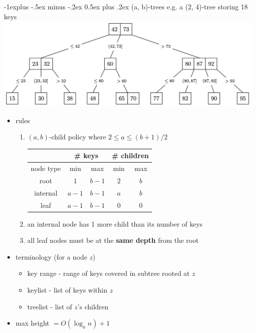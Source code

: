 \documentclass[10pt, landscape]{article}
\makeatletter
\renewcommand{\subsection}{\@startsection{subsection}{2}{0mm}%
                                {-1explus -.5ex minus -.2ex}%
                                {0.5ex plus .2ex}%
                                {\normalfont\normalsize\bfseries}}
\makeatother
\begin{document}
\begin{multicols}{3}
\subsection{(a, b)-trees}
{\scriptsize{e.g. a (2, 4)-tree storing 18 keys}}
\includegraphics[width=1\linewidth]{cs2040s-ab-tree.png}
\begin{itemize}
    \item rules
    \begin{enumerate}
        \item $(a, b)$-child policy where $2 \leq a \leq (b+1)/2$
        \begin{tabular}{|c|c|c|c|c|}
            \hline 
             & \multicolumn{2}{c|}{\# keys} & \multicolumn{2}{c|}{\# children}
            \\\hline
            node type & min & max & min & max
            \\\hline
            root & $1$ & $b-1$ & $2$ & $b$
            \\\hline
            internal & $a-1$ & $b-1$ & $a$ & $b$
            \\\hline
            leaf & $a-1$ & $b-1$ & $0$ & $0$
            \\\hline
        \end{tabular}
        \item an internal node has 1 more child than its number of keys
        \item all leaf nodes must be at the \textbf{same depth} from the root
    \end{enumerate}
    \item terminology (for a node $z$)
    \begin{itemize}
        \item key range - range of keys covered in subtree rooted at $z$
        \item keylist - list of keys within $z$
        \item treelist - list of $z$'s children
    \end{itemize}
    \item max height $= O(\log_an) + 1$

\end{itemize}
\end{multicols}
\end{document}
